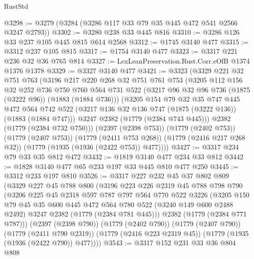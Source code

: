 \begin{lexlean}{RustStd}
\begin{coremodule}
@3298 := @3279 (@3284 (@3286 @117 @33 @79 @35 @445 @472 @541 @2566 @3247 @2793))
@3302 := @3280 @238 @33 @445 @816
@3310 := @3286 @126 @33 @237 @105 @445 @815 @614 @2568
@3312 := @1745 @3140 @477
@3315 := @3312 @237 @105 @815
@3317 := @1754 @3140 @477
@3323 := @3317 @221 @236 @32 @36 @765 @814
@3327 := LexLeanPreservation.Rust.Corr.eOfB @1374 @1376 @1378
@3329 := @3327 @3140 @477
@3421 := @3323
    (@3329
      @221
      @32
      @751
      @763
      (@3196
        @217
        @220
        @268
        @32
        @751
        @761
        @753
        (@3205
          @112
          @156
          @32
          @252
          @736
          @750
          @760
          @564
          @731
          @522
          (@3217 @96 @32 @96 @736 (@1875 (@3222 @96)) (@1883 (@1884 @736)))
          (@3205
            @154
            @79
            @32
            @35
            @747
            @445
            @472
            @564
            @742
            @522
            (@3217 @136 @32 @136 @747 (@1875 (@3222 @136)) (@1883 (@1884 @747)))
            @3247
            @2382
            (@1779 (@2384 @743 @445)))
          @2382
          (@1779 (@2384 @732 @750)))
        (@2397 (@2398 @753))
        (@1779 (@2402 @753))
        (@1779 (@2407 @753))
        (@1779 (@2411 @753 @268))
        (@1779 (@2416 @217 @268 @32))
        (@1779 (@1935 (@1936 (@2422 @753)) @477))))
@3427 := @3317 @234 @79 @33 @35 @812 @472
@3432 := @1819 @3140 @477 @234 @33 @812
@3442 := @1828 @3140 @477 @65 @233 @197 @33 @445 @810 @477 @250
@3445 := @3312 @233 @197 @810
@3526 := @3317
    @227
    @232
    @45
    @37
    @802
    @809
    (@3329
      @227
      @45
      @788
      @800
      (@3196
        @223
        @226
        @2319
        @45
        @788
        @798
        @790
        (@3206
          @225
          @45
          @2318
          @597
          @787
          @797
          @564
          @770
          @522
          @3226
          (@3205
            @150
            @79
            @45
            @35
            @600
            @445
            @472
            @564
            @780
            @522
            (@3240 @149 @600 @2488 @2492)
            @3247
            @2382
            (@1779 (@2384 @781 @445)))
          @2382
          (@1779 (@2384 @771 @787)))
        (@2397 (@2398 @790))
        (@1779 (@2402 @790))
        (@1779 (@2407 @790))
        (@1779 (@2411 @790 @2319))
        (@1779 (@2416 @223 @2319 @45))
        (@1779 (@1935 (@1936 (@2422 @790)) @477))))
@3543 := @3317
    @152
    @231
    @33
    @36
    @804
    @808

\end{coremodule}
\end{lexlean}
